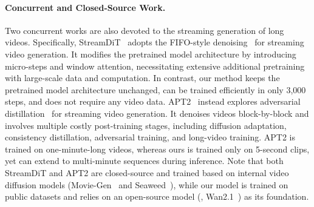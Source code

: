 \paragraph{Concurrent and Closed-Source Work.} 
Two concurrent works are also devoted to the streaming generation of long videos.
% 
Specifically, StreamDiT~\citep{kodaira2025streamdit} adopts the FIFO-style denoising~\citep{kim2024fifo} for streaming video generation. It modifies the pretrained model architecture by introducing micro-steps and window attention, necessitating extensive additional pretraining with large-scale data and computation. In contrast, our method keeps the pretrained model architecture unchanged, can be trained efficiently in only 3,000 steps, and does not require any video data.
APT2~\citep{lin2025autoregressive} instead explores adversarial distillation~\citep{lin2025diffusion} for streaming video generation. It denoises videos block-by-block and involves multiple costly post-training stages, including diffusion adaptation, consistency distillation, adversarial training, and long-video training. APT2 is trained on one-minute-long videos, whereas ours is trained only on 5-second clips, yet can extend to multi-minute sequences during inference.
Note that both StreamDiT and APT2 are closed-source and trained based on internal video diffusion models (Movie-Gen~\citep{polyak2024movie} and Seaweed~\citep{seawead2025seaweed}), 
while our model is trained on public datasets and relies on an open-source model (\ie, Wan2.1~\citep{wan2025wan}) as its foundation.
